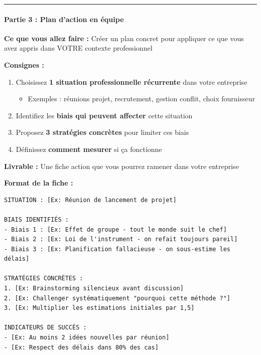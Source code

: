 \documentclass[
]{article}
\providecommand{\tightlist}{%
  \setlength{\itemsep}{0pt}\setlength{\parskip}{0pt}}
\begin{document}
\begin{center}\rule{0.5\linewidth}{0.5pt}\end{center}

\paragraph{\texorpdfstring{\textbf{Partie 3 : Plan d'action en
équipe}}{Partie 3 : Plan d'action en équipe}}\label{partie-3-plan-daction-en-uxe9quipe}

\textbf{Ce que vous allez faire :} Créer un plan concret pour appliquer
ce que vous avez appris dans VOTRE contexte professionnel

\textbf{Consignes :}

\begin{enumerate}
\def\labelenumi{\arabic{enumi}.}
\tightlist
\item
  Choisissez \textbf{1 situation professionnelle récurrente} dans votre
  entreprise

  \begin{itemize}
  \tightlist
  \item
    Exemples : réunions projet, recrutement, gestion conflit, choix
    fournisseur
  \end{itemize}
\item
  Identifiez les \textbf{biais qui peuvent affecter} cette situation
\item
  Proposez \textbf{3 stratégies concrètes} pour limiter ces biais
\item
  Définissez \textbf{comment mesurer} si ça fonctionne
\end{enumerate}

\textbf{Livrable :} Une fiche action que vous pourrez ramener dans votre
entreprise

\textbf{Format de la fiche :}

\begin{verbatim}
SITUATION : [Ex: Réunion de lancement de projet]

BIAIS IDENTIFIÉS :
- Biais 1 : [Ex: Effet de groupe - tout le monde suit le chef]
- Biais 2 : [Ex: Loi de l'instrument - on refait toujours pareil]
- Biais 3 : [Ex: Planification fallacieuse - on sous-estime les délais]

STRATÉGIES CONCRÈTES :
1. [Ex: Brainstorming silencieux avant discussion]
2. [Ex: Challenger systématiquement "pourquoi cette méthode ?"]
3. [Ex: Multiplier les estimations initiales par 1,5]

INDICATEURS DE SUCCÈS :
- [Ex: Au moins 2 idées nouvelles par réunion]
- [Ex: Respect des délais dans 80% des cas]
\end{verbatim}
\end{document}
